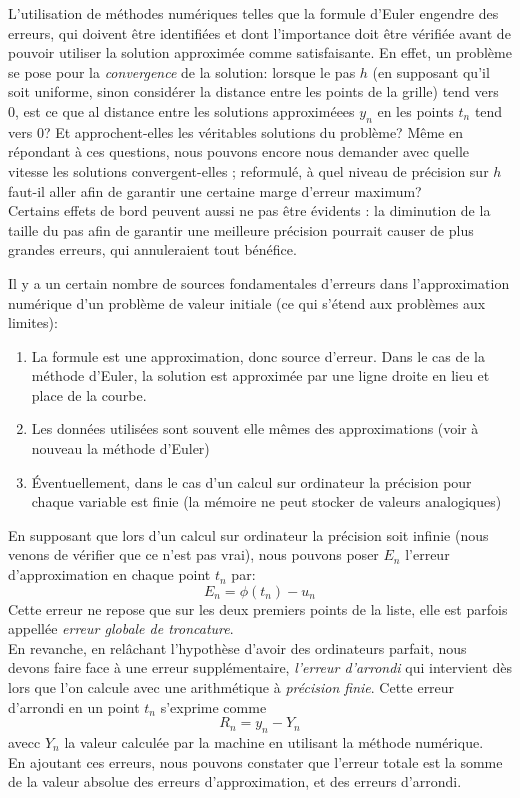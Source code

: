 \documentclass[12pt]{article}
\begin{document}
\quad L'utilisation de méthodes numériques telles que la formule d'Euler engendre des erreurs, qui doivent être identifiées et dont l'importance doit être vérifiée avant de pouvoir utiliser la solution approximée comme satisfaisante. En effet, un problème se pose pour la \emph{convergence} de la solution: lorsque le pas $h$ (en supposant qu'il soit uniforme, sinon considérer la distance entre les points de la grille) tend vers 0, est ce que al distance entre les solutions approximéees $y_n$ en les points $t_n$ tend vers 0? Et approchent-elles les véritables solutions du problème?
Même en répondant à ces questions, nous pouvons encore nous demander avec quelle vitesse les solutions convergent-elles ; reformulé, à quel niveau de précision sur $h$ faut-il aller afin de garantir une certaine marge d'erreur maximum? \\Certains effets de bord peuvent aussi ne pas être évidents : la diminution de la taille du pas afin de garantir une meilleure précision pourrait causer de plus grandes erreurs, qui annuleraient tout bénéfice.

Il y a un certain nombre de sources fondamentales d'erreurs dans l'approximation numérique d'un problème de valeur initiale (ce qui s'étend aux problèmes aux limites):
\begin{enumerate}
 	\item La formule est une approximation, donc source d'erreur. Dans le cas de la méthode d'Euler, la solution est approximée par une ligne droite en lieu et place de la courbe.
	\item Les données utilisées sont souvent elle mêmes des approximations (voir à nouveau la méthode d'Euler)
	\item Éventuellement, dans le cas d'un calcul sur ordinateur la précision pour chaque variable est finie (la mémoire ne peut stocker de valeurs analogiques)
\end{enumerate}

En supposant que lors d'un calcul sur ordinateur la précision soit infinie (nous venons de vérifier que ce n'est pas vrai), nous pouvons poser $E_n$ l'erreur d'approximation en chaque point $t_n$ par:
\begin{equation}
E_n = \phi(t_n) - u_n
\end{equation}
Cette erreur ne repose que sur les deux premiers points de la liste, elle est parfois appellée \emph{erreur globale de troncature}. \\
\quad En revanche, en relâchant l'hypothèse d'avoir des ordinateurs parfait, nous devons faire face à une erreur supplémentaire,  \emph{l'erreur d'arrondi} qui intervient dès lors que l'on calcule avec une arithmétique à \emph{précision finie}. Cette erreur d'arrondi en un point $t_n$ s'exprime comme
\begin{equation}
R_n = y_n - Y_n
\end{equation}
avecc $Y_n$ la valeur calculée par la machine en utilisant la méthode numérique. \\
En ajoutant ces erreurs, nous pouvons constater que l'erreur totale est la somme de la valeur absolue des erreurs d'approximation, et des erreurs d'arrondi.\\
\end{document}
